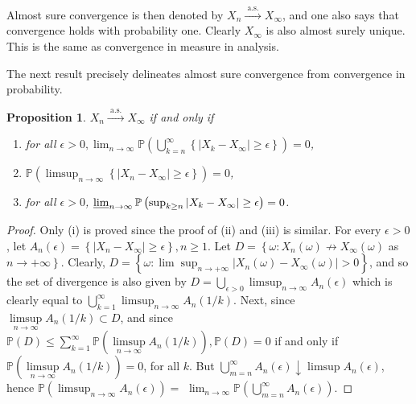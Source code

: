 \documentclass[11pt]{amsbook}
\theoremstyle{plain}%
\newtheorem{prop}[thm]{Proposition}
\theoremstyle{definition}
\theoremstyle{remark}
\begin{document}
Almost sure convergence is then denoted by $X_{n} \xrightarrow{\text { a.s. }} X_{\infty}$, and one also says that convergence holds with probability one. Clearly $X_{\infty}$ is also almost surely unique. This is the same as convergence in measure in analysis.

The next result precisely delineates almost sure convergence from convergence in probability.

\begin{prop} $X_{n} \xrightarrow{\text { a.s. }} X_{\infty}$ if and only if 
\begin{enumerate}
\item[(i)] for all $\epsilon>0, \lim _{n \rightarrow \infty} \mathbb{P}\left(\bigcup_{k=n}^{\infty}\left\{\left|X_{k}-X_{\infty}\right| \geq \epsilon\right\}\right)=0$,
\item[(ii)] $\mathbb{P}\left(\limsup _{n \rightarrow \infty}\left\{\left|X_{n}-X_{\infty}\right| \geq \epsilon\right\}\right)=0$,
\item[(iii)] for all $\epsilon>0$, $\varliminf_{n \rightarrow \infty} \mathbb{P}\left(\sup _{k \geq n}\left|X_{k}-X_{\infty}\right| \geq \epsilon\right)=0$.
\end{enumerate}
\end{prop}

\begin{proof}
Only (i) is proved since the proof of (ii) and (iii) is similar. For every $\epsilon>0$, let $A_{n}(\epsilon)=\left\{\left|X_{n}-X_{\infty}\right| \geq \epsilon\right\}, n \geq 1$. Let $D=\left\{\omega: X_{n}(\omega) \nrightarrow X_{\infty}(\omega)\right.$ as $\left.n \rightarrow+\infty\right\}$. Clearly, $D=\left\{\omega: \lim \sup _{n \rightarrow+\infty}\left|X_{n}(\omega)-X_{\infty}(\omega)\right|>0\right\}$, and so the set of divergence is also given by $D=\bigcup_{\epsilon>0} \limsup _{n \rightarrow \infty} A_{n}(\epsilon)$ which is clearly equal to $\bigcup_{k=1}^{\infty} \limsup _{n \rightarrow \infty} A_{n}(1 / k)$. Next, since $\underset{n \rightarrow \infty}{\limsup } A_{n}(1 / k) \subset D$, and since $\mathbb{P}(D) \leq \sum_{k=1}^{\infty} \mathbb{P}\left(\underset{n \rightarrow \infty}{\limsup } A_{n}(1 / k)\right), \mathbb{P}(D)=0$ if and only if $\mathbb{P}\left(\underset{n \rightarrow \infty}{\limsup } A_{n}(1 / k)\right)=0$, for all $k$. But $\bigcup_{m=n}^{\infty} A_{n}(\epsilon) \downarrow \limsup A_{n}(\epsilon)$, hence $\mathbb{P}\left(\limsup _{n \rightarrow \infty} A_{n}(\epsilon)\right)=$ $\lim _{n \rightarrow \infty} \mathbb{P}\left(\bigcup_{m=n}^{\infty} A_{n}(\epsilon)\right)$.
\end{proof} 
\end{document}
